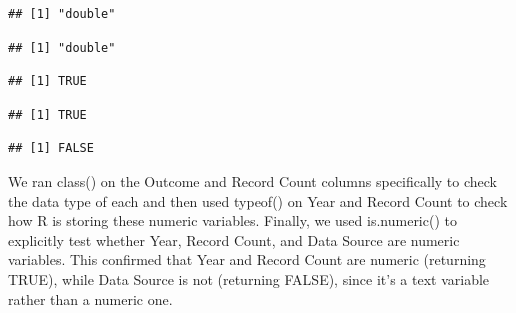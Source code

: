 \documentclass[
]{article}
\newenvironment{Shaded}{\begin{snugshade}}{\end{snugshade}}
\newcommand{\AttributeTok}[1]{\textcolor[rgb]{0.13,0.29,0.53}{#1}}
\newcommand{\FunctionTok}[1]{\textcolor[rgb]{0.13,0.29,0.53}{\textbf{#1}}}
\newcommand{\NormalTok}[1]{#1}
\newcommand{\SpecialCharTok}[1]{\textcolor[rgb]{0.81,0.36,0.00}{\textbf{#1}}}
\newcommand{\StringTok}[1]{\textcolor[rgb]{0.31,0.60,0.02}{#1}}
\begin{document}
\begin{verbatim}
## [1] "double"
\end{verbatim}

\begin{Shaded}
\end{Shaded}

\begin{verbatim}
## [1] "double"
\end{verbatim}

\begin{Shaded}
\end{Shaded}

\begin{verbatim}
## [1] TRUE
\end{verbatim}

\begin{Shaded}
\end{Shaded}

\begin{verbatim}
## [1] TRUE
\end{verbatim}

\begin{Shaded}
\end{Shaded}

\begin{verbatim}
## [1] FALSE
\end{verbatim}

We ran class() on the Outcome and Record Count columns specifically to
check the data type of each and then used typeof() on Year and Record
Count to check how R is storing these numeric variables. Finally, we
used is.numeric() to explicitly test whether Year, Record Count, and
Data Source are numeric variables. This confirmed that Year and Record
Count are numeric (returning TRUE), while Data Source is not (returning
FALSE), since it's a text variable rather than a numeric one.
\end{document}

